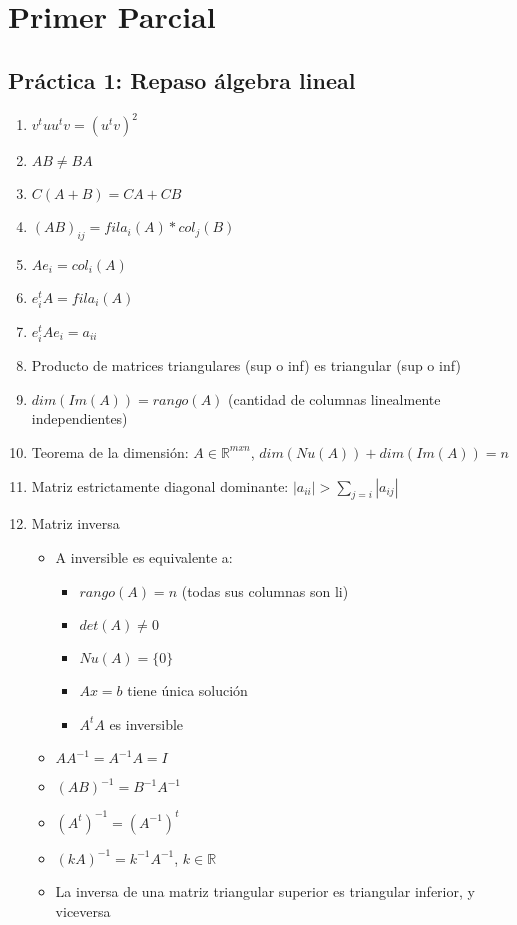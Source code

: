 \section*{Primer Parcial}
\subsection*{Práctica 1: Repaso álgebra lineal}
\begin{enumerate}
    \item $v^tuu^tv = (u^tv)^2$
    \item $AB \neq BA$
    \item $C(A+B) = CA + CB$
    \item $(AB)_{ij} = fila_i(A)*col_j(B)$
    \item $Ae_{i} = col_i(A)$
    \item $e_i^tA = fila_i(A)$
    \item $e_i^tAe_i = a_{ii}$
    \item Producto de matrices triangulares (sup o inf) es triangular (sup o inf)
    \item $dim(Im(A)) = rango(A)$ (cantidad de columnas linealmente independientes)
    \item Teorema de la dimensión: $A \in \mathbb{R}^{mxn}$, $dim(Nu(A)) + dim(Im(A)) = n$
    \item Matriz estrictamente diagonal dominante: $|a_{ii}| > \sum_{j=i}{}|a_{ij}|$
    \item Matriz inversa
    \begin{itemize}
    \item A inversible es equivalente a:
        \begin{itemize}
        \item $rango(A) = n$ (todas sus columnas son li)
        \item $det(A)\neq0$
        \item $Nu(A) = \{0\}$
        \item $Ax=b$ tiene única solución
        \item $A^tA$ es inversible
        \end{itemize}
    \item $AA^{-1} = A^{-1}A = I$
    \item $(AB)^{-1} = B^{-1}A^{-1}$
    \item $(A^t)^{-1} = (A^{-1})^t$
    \item $(kA)^{-1} = k^{-1} A^{-1}$, $k\in\mathbb{R}$
    \item La inversa de una matriz triangular superior es triangular inferior, y viceversa

\end{itemize}
\end{enumerate}
